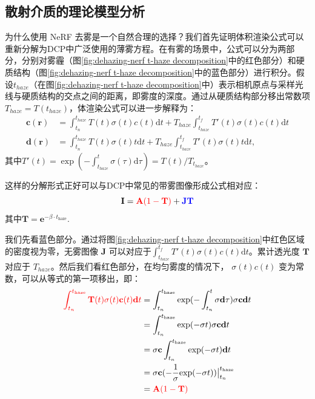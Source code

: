 \subsection{散射介质的理论模型分析}
为什么使用 NeRF 去雾是一个自然合理的选择？我们首先证明体积渲染公式可以重新分解为DCP\cite{kaiming_he_single_2009}中广泛使用的薄雾方程。在有雾的场景中，公式可以分为两部分，分别对雾霾（图\ref{fig:dehazing-nerf t-haze decomposition}中的红色部分）和硬质结构（图\ref{fig:dehazing-nerf t-haze decomposition}中的蓝色部分）进行积分。假设$t_{haze}$（在图\ref{fig:dehazing-nerf t-haze decomposition}中）表示相机原点与采样光线与硬质结构的交点之间的距离，即雾度的深度。通过从硬质结构部分移出常数项 $T_{haze} = T(t_{haze})$，体渲染公式可以进一步解释为：
\begin{align}
    \textbf{c}(\textbf{r}) &= \int_{t_n}^{t_{haze}}T(t)\sigma(t)c(t)\text{d}t + T_{haze}\int_{t_{haze}}^{t_f}T'(t)\sigma(t)c(t)\text{d}t\\
    \textbf{d}(\textbf{r}) &= \int_{t_n}^{t_{haze}}T(t)\sigma(t)t\text{d}t + T_{haze}\int_{t_{haze}}^{t_f}T'(t)\sigma(t)t\text{d}t,
\end{align}
其中$T'(t)=\exp(-\int_{t_{haze}}^{t}\sigma(\tau)\text{d}\tau)=T(t)/T_{t_{haze}}$。

这样的分解形式正好可以与DCP中常见的带雾图像形成公式相对应：
\begin{equation}
    \mathbf{I}= \textcolor{red}{\mathbf{A} (1-\mathbf{T})} + \textcolor{blue}{\mathbf{J} \mathbf{T}}
\end{equation}
其中$\mathbf{T}=\mathbf{e}^{-\beta \cdot t_\text{haze}}$.

我们先看蓝色部分。通过将图\ref{fig:dehazing-nerf t-haze decomposition}中红色区域的密度视为零，无雾图像 $\mathbf{J}$ 可以对应于$\int_{t_{haze}}^{t_f}T'(t)\sigma(t)c(t)\text{d}t$。累计透光度 $\mathbf{T}$ 对应于 ${T_{haze}}$。然后我们看红色部分，在均匀雾度的情况下， $σ(t)c(t)$ 变为常数，可以从等式的第一项移出，即：
\begin{align*}
    \textcolor{red}{\int_{t_n}^{{t}_\text{haze}}\mathbf{T}(t){{\sigma}}(t){\mathbf{c}}(t)\mathbf{d}t} &= \int_{t_n}^{t_\text{haze}} \text{exp}(-\int_{t_n}^t {\sigma}\mathbf{d}\tau) {\sigma}{\mathbf{c}}\mathbf{d}t \\
    &=\int_{t_n}^{t_\text{haze}} \text{exp}(-{\sigma}t) {\sigma}{\mathbf{c}}\mathbf{d}t \\
    &={\sigma}{\mathbf{c}}\int_{t_n}^{t_\text{haze}} \text{exp}(-{\sigma}t) \mathbf{d}t \\
    &={\sigma}{\mathbf{c}}(-\frac{1}{{\sigma}}\text{exp}(-{\sigma}t))\big|_{t_n}^{t_\text{haze}} \\
    &=\textcolor{red}{\mathbf{A}(1-\mathbf{T})}
\end{align*}

